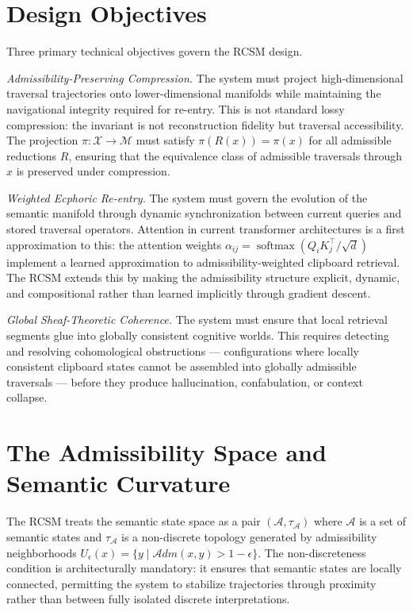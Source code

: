\documentclass[12pt,oneside]{book}
\theoremstyle{plain}
\theoremstyle{definition}
\theoremstyle{plain}
\DeclareMathOperator{\softmax}{softmax}
\newcommand{\cA}{\mathcal{A}}
\newcommand{\cM}{\mathcal{M}}
\newcommand{\cX}{\mathcal{X}}
\begin{document}
\section{Design Objectives}

Three primary technical objectives govern the RCSM design.

\emph{Admissibility-Preserving Compression.} The system must project high-dimensional traversal trajectories onto lower-dimensional manifolds while maintaining the navigational integrity required for re-entry. This is not standard lossy compression: the invariant is not reconstruction fidelity but traversal accessibility. The projection $\pi : \cX \to \cM$ must satisfy $\pi(R(x)) = \pi(x)$ for all admissible reductions $R$, ensuring that the equivalence class of admissible traversals through $x$ is preserved under compression.

\emph{Weighted Ecphoric Re-entry.} The system must govern the evolution of the semantic manifold through dynamic synchronization between current queries and stored traversal operators. Attention in current transformer architectures is a first approximation to this: the attention weights $\alpha_{ij} = \softmax(Q_i K_j^\top / \sqrt{d})$ implement a learned approximation to admissibility-weighted clipboard retrieval. The RCSM extends this by making the admissibility structure explicit, dynamic, and compositional rather than learned implicitly through gradient descent.

\emph{Global Sheaf-Theoretic Coherence.} The system must ensure that local retrieval segments glue into globally consistent cognitive worlds. This requires detecting and resolving cohomological obstructions — configurations where locally consistent clipboard states cannot be assembled into globally admissible traversals — before they produce hallucination, confabulation, or context collapse.

\section{The Admissibility Space and Semantic Curvature}

The RCSM treats the semantic state space as a pair $(\cA, \tau_\cA)$ where $\cA$ is a set of semantic states and $\tau_\cA$ is a non-discrete topology generated by admissibility neighborhoods $U_\epsilon(x) = \{y \mid \mathcal{A}dm(x,y) > 1-\epsilon\}$. The non-discreteness condition is architecturally mandatory: it ensures that semantic states are locally connected, permitting the system to stabilize trajectories through proximity rather than between fully isolated discrete interpretations.
\end{document}
